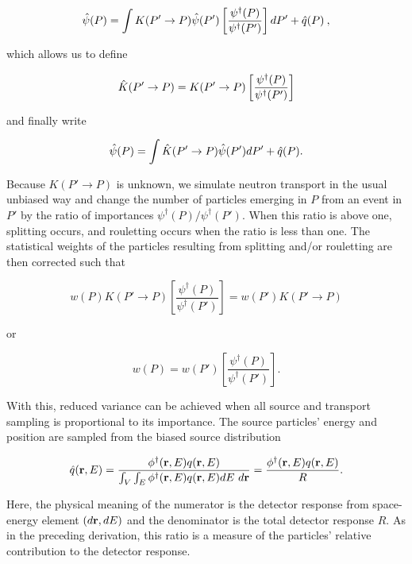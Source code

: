 \begin{equation}
\hat{\psi}(P) = \int K(P'\rightarrow P)\hat{\psi}(P')
\left[\frac{\psi^{\dagger}(P)}{\psi^{\dagger}(P')}\right]dP' + \hat{q}(P)\:,
\end{equation}

\noindent which allows us to define

\begin{equation}
\hat{K}(P' \rightarrow P) = K(P'\rightarrow P)
\left[\frac{\psi^{\dagger}(P)}{\psi^{\dagger}(P')}\right]
\end{equation}

\noindent and finally write

\begin{equation}
\hat{\psi}(P) = \int\hat{K}(P' \rightarrow P)\hat{\psi}(P')dP' +\hat{q}(P).
\end{equation}

Because $K(P'\rightarrow P)$ is unknown, we simulate neutron transport in the usual
unbiased way and change the number of particles emerging in $P$ from an event in
$P'$ by the ratio of importances $\psi^{\dagger}(P)/\psi^{\dagger}(P')$. When this
ratio is above one, splitting occurs, and rouletting occurs when the ratio is less 
than one. The statistical weights of the particles resulting from splitting and/or
rouletting are then corrected such that

\begin{equation}
w(P)K(P' \rightarrow P)\left[\frac{\psi^{\dagger}(P)}{\psi^{\dagger}(P')}\right] = 
w(P')K(P' \rightarrow P)
\end{equation}

\noindent or

\begin{equation}
w(P) = w(P')\left[\frac{\psi^{\dagger}(P)}{\psi^{\dagger}(P')}\right].
\label{eq:cadis_w3}
\end{equation}

\noindent With this, reduced variance can be achieved when all source and transport
sampling is proportional to its importance. The source particles' energy and position
are sampled from the biased source distribution

\begin{equation}
\hat{q}(\textbf{r},E) = 
\frac{\phi^{\dagger}(\textbf{r},E)q(\textbf{r},E)}
{\int_V\int_E\phi^{\dagger}(\textbf{r},E)q(\textbf{r},E) dE\ d\textbf{r}} 
= \frac{\phi^{\dagger}(\textbf{r},E)q(\textbf{r},E)}{R}.
\label{eq:cadis_sb}
\end{equation}

\noindent Here, the physical meaning of the numerator is the detector response from
space-energy element $(d\textbf{r},dE)$ and the denominator is the total detector response
$R$. As in the preceding derivation, this ratio is a measure of the particles' 
relative contribution to the detector response.

